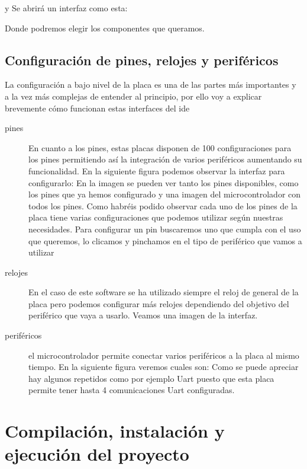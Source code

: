 \imagen{}{}

y Se abrirá un interfaz como esta:

\image{}{}

Donde podremos elegir los componentes que queramos.



\subsection{Configuración de pines, relojes y periféricos}
La configuración a bajo nivel de la placa es una de las partes más importantes y a la vez más complejas de entender al principio, por ello voy a explicar brevemente cómo funcionan estas interfaces del ide

\begin{description}
\item[pines] En cuanto a los pines, estas placas disponen de 100 configuraciones para los pines permitiendo así la integración de varios periféricos aumentando su funcionalidad. En la siguiente figura podemos observar la interfaz para configurarlo:
\imagen{}{}
En la imagen se pueden ver tanto los pines disponibles, como los pines que ya hemos configurado y una imagen del microcontrolador con todos los pines.
Como habréis podido observar cada uno de los pines de la placa tiene varias configuraciones que podemos utilizar según nuestras necesidades. Para configurar un pin buscaremos uno que cumpla con el uso que queremos, lo clicamos y pinchamos en el tipo de periférico que vamos a utilizar
\item[relojes] En el caso de este software se ha utilizado siempre el reloj de general de la placa pero podemos configurar más relojes dependiendo del objetivo del periférico que vaya a usarlo. Veamos una imagen de la interfaz.
\item[periféricos] el microcontrolador permite conectar varios periféricos a la placa al mismo tiempo. En la siguiente figura veremos cuales son:
Como se puede apreciar hay algunos repetidos como por ejemplo Uart puesto que esta placa permite tener hasta 4 comunicaciones Uart configuradas.
\end{description}



\section{Compilación, instalación y ejecución del proyecto}

